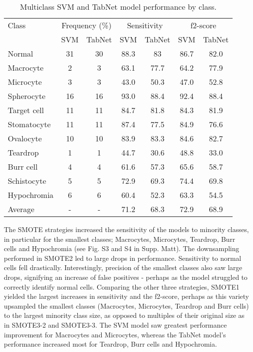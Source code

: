 \documentclass[final,5p,times,twocolumn,authoryear]{elsarticle}
\begin{document}
\begin{table}[t!]
\caption{Multiclass SVM and TabNet model performance by class.}
\footnotesize
\centering
\begin{tabular}{@{}lcccccc@{}} \toprule
    \centering
Class & \multicolumn{2}{c}{Frequency (\%)} & \multicolumn{2}{c}{Sensitivity} & \multicolumn{2}{c}{f2-score} \\ 
 &	SVM	& TabNet	& SVM	& TabNet	& SVM	& TabNet \\\midrule
Normal	& 31	& 30	& 88.3	& 83	& 86.7	& 82.0 \\
Macrocyte	& 2	& 3	& 63.1	& 77.7	& 64.2	& 77.9\\
Microcyte	& 3	& 3	& 43.0	& 50.3	& 47.0	& 52.8\\
Spherocyte	& 16	& 16	& 93.0	& 88.4	& 92.4	& 88.4 \\
Target cell	& 11	& 11	& 84.7	& 81.8	& 84.3	& 81.9 \\
Stomatocyte	& 11	& 11	& 87.4	& 77.5	& 84.9	& 76.6 \\
Ovalocyte	& 10	& 10	& 83.9	& 83.3	& 84.6	& 82.7 \\
Teardrop	& 1	& 1	& 44.7	& 30.6	& 48.8	& 33.0 \\
Burr cell	& 4	& 4	& 61.6	& 57.3	& 65.6	& 58.7 \\
Schistocyte	& 5	& 5	& 72.9	& 69.3	& 74.4	& 69.8 \\
Hypochromia	& 6	& 6	& 60.4	& 52.3	& 63.3	& 54.5 \\ \midrule
Average & - & - & 71.2 &  68.3 & 72.9 &  68.9\\
\bottomrule

\end{tabular}
\label{table:res2}
\end{table}

The SMOTE strategies increased the sensitivity of the models to minority classes, in particular for the smallest classes; Macrocytes, Microcytes, Teardrop, Burr cells and Hypochromia (see Fig. S3 and S4 in Supp. Matt).
The downsampling performed in SMOTE2 led to large drops in performance. Sensitivity to normal cells fell drastically. Interestingly, precision of the smallest classes also saw large drops, signifying an increase of false positives - perhaps as the model struggled to correctly identify normal cells.
Comparing the other three strategies, SMOTE1 yielded the largest increases in sensitivity and the f2-score, perhaps as this variety upsampled the smallest classes (Macrocytes, Microcytes, Teardrop and Burr cells) to the largest minority class size, as opposed to multiples of their original size as in SMOTE3-2 and SMOTE3-3.
The SVM model saw greatest performance improvement for Macrocytes and Microcytes, whereas the TabNet model's performance increased most for Teardrop, Burr cells and Hypochromia.
\end{document}
